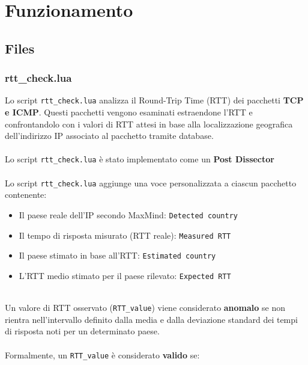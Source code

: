 \chapter{Funzionamento}

\section{Files}

\subsection{rtt\_check.lua}

Lo script \texttt{rtt\_check.lua} analizza il Round-Trip Time (RTT) dei pacchetti \textbf{TCP e ICMP}. Questi pacchetti vengono esaminati estraendone l'RTT e confrontandolo con i valori di RTT attesi in base alla localizzazione geografica dell'indirizzo IP associato al pacchetto tramite database.\\
\\
Lo script \texttt{rtt\_check.lua} è stato implementato come un \textbf{Post Dissector}\\
\\
Lo script \texttt{rtt\_check.lua} aggiunge una voce personalizzata a ciascun pacchetto contenente:

\begin{itemize}
  \item Il paese reale dell'IP secondo MaxMind: \texttt{Detected country}
  \item Il tempo di risposta misurato (RTT reale): \texttt{Measured RTT}
  \item Il paese stimato in base all'RTT: \texttt{Estimated country}
  \item L'RTT medio stimato per il paese rilevato: \texttt{Expected RTT}
\end{itemize}
\\
Un valore di RTT osservato (\texttt{RTT\_value}) viene considerato \textbf{anomalo} se non rientra nell'intervallo definito dalla media e dalla deviazione standard dei tempi di risposta noti per un determinato paese.\\
\\
Formalmente, un \texttt{RTT\_value} è considerato \textbf{valido} se: 

